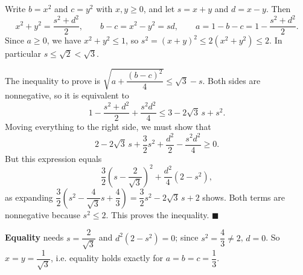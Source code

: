 Write $b=x^2$ and $c=y^2$ with $x,y\ge0$, and let $s=x+y$ and $d=x-y$. Then
\[x^2+y^2=\dfrac{s^2+d^2}{2},\qquad b-c=x^2-y^2=sd,\qquad a=1-b-c=1-\dfrac{s^2+d^2}{2}.\]
Since $a\ge0$, we have $x^2+y^2\le1$, so $s^2=(x+y)^2\le2\left(x^2+y^2\right)\le2$. In particular $s\le\sqrt2<\sqrt3$.

The inequality to prove is $\sqrt{a+\dfrac{(b-c)^2}{4}}\le\sqrt3-s$. Both sides are nonnegative, so it is equivalent to
\[1-\dfrac{s^2+d^2}{2}+\dfrac{s^2d^2}{4}\le3-2\sqrt3\,s+s^2.\]
Moving everything to the right side, we must show that
\[2-2\sqrt3\,s+\dfrac32s^2+\dfrac{d^2}{2}-\dfrac{s^2d^2}{4}\ge0.\]
But this expression equals
\[\dfrac32\left(s-\dfrac{2}{\sqrt3}\right)^2+\dfrac{d^2}{4}\left(2-s^2\right),\]
as expanding $\dfrac32\left(s^2-\dfrac{4}{\sqrt3}s+\dfrac43\right)=\dfrac32s^2-2\sqrt3\,s+2$ shows. Both terms are nonnegative because $s^2\le2$. This proves the inequality. $\blacksquare$

\textbf{Equality} needs $s=\dfrac{2}{\sqrt3}$ and $d^2\left(2-s^2\right)=0$; since $s^2=\dfrac43\ne2$, $d=0$. So $x=y=\dfrac{1}{\sqrt3}$, i.e. equality holds exactly for $a=b=c=\dfrac13$.
